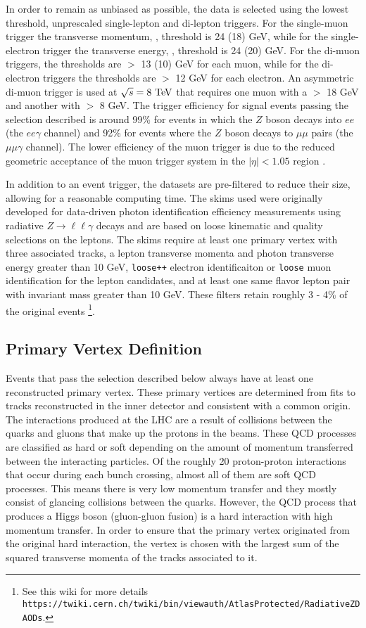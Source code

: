 In order to remain as unbiased as possible, the data is selected using the lowest
threshold, unprescaled single-lepton and di-lepton triggers. For the
single-muon trigger the transverse momentum, \pt, threshold is 24 (18) GeV, while
for the single-electron trigger the transverse energy, \et, threshold is 24 (20) GeV.
For the di-muon triggers, the thresholds are \pt $>$ 13 (10) GeV for each muon, while
for the di-electron triggers the thresholds are \et $>$ 12 GeV for each electron.
An asymmetric di-muon trigger is used at $\rts = 8 \TeV$ that requires one muon with 
a \pt $>$ 18 GeV and another with \pt $>$ 8 GeV. 
The trigger efficiency for signal
events passing the selection described is around 99\% for events in which the
$Z$ boson decays into $ee$ (the $ee\gamma$ channel) and 92\% for events where
the $Z$ boson decays to $\mu\mu$ pairs (the $\mu\mu\gamma$ channel). The lower
efficiency of the muon trigger is due to the reduced geometric acceptance of the muon
trigger system in the $|\eta| < 1.05$ region \cite{ATLAS-CONF-2013-009}.

In addition to an event trigger, the datasets are pre-filtered to 
reduce their size, allowing for a reasonable computing time.
The skims used were originally developed for data-driven photon identification
efficiency measurements using radiative $Z \to \ell\ell\gamma$ decays and
are based on loose kinematic and quality selections on the leptons. The
skims require at least one primary vertex with three associated tracks,
a lepton transverse momenta and photon transverse energy greater than 10 GeV,
{\tt loose++} electron identificaiton or {\tt loose} muon identification for
the lepton candidates, and at least one same flavor lepton pair with invariant mass
greater than 10 GeV. These filters retain roughly 3 - 4\% of the original events
\footnote{See this wiki for more details 
{\tt https://twiki.cern.ch/twiki/bin/viewauth/AtlasProtected/RadiativeZDAODs}.}.

\subsection{Primary Vertex Definition}
Events that pass the selection described below always have at least one
reconstructed primary vertex. These primary vertices are determined from fits
to tracks reconstructed in the inner detector and consistent with a common origin.
The interactions produced at the LHC are a result of collisions between the quarks
and gluons that make up the protons in the beams. These QCD processes are
classified as hard or soft depending on the amount of momentum transferred 
between the interacting particles. Of the roughly 20 proton-proton interactions
that occur during each bunch crossing, almost all of them are soft QCD processes.
This means there is very low momentum transfer and they mostly consist of glancing 
collisions between the quarks. However, the QCD process that produces a Higgs boson 
(gluon-gluon fusion) is a hard interaction with high momentum transfer.
In order to ensure that the primary vertex originated from the original hard 
interaction, the vertex is chosen with the largest sum of the 
squared transverse momenta of the tracks associated to it.

